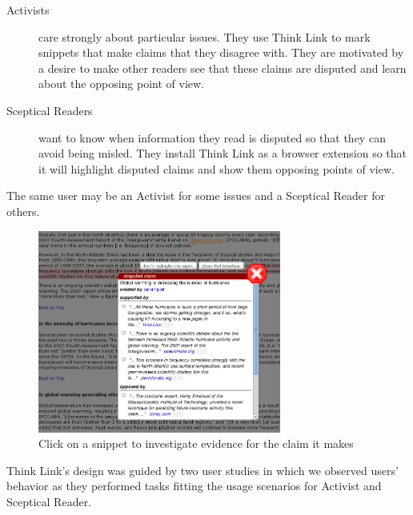 \documentclass{chi2009}
\newcommand{\todo}[1]{}
\begin{document}
\begin{description}
\item[Activists] care strongly about particular issues. They use Think Link to mark snippets that make claims that they disagree with. They are motivated by a desire to make other readers see that these claims are disputed and learn about the opposing point of view.

\item[Sceptical Readers] want to know when information they read is disputed so that they can avoid being misled. They install Think Link as a browser extension so that it will highlight disputed claims and show them opposing points of view.
\end{description}

The same user may be an Activist for some issues and a Sceptical Reader for others.

\begin{figure}[tb]
	\begin{center}
	\includegraphics[width=8cm]{../screenshots/v2_popup_dim.png}
	\caption{Click on a snippet to investigate evidence for the claim it makes}
	\label{claimview}
	\end{center}
\end{figure}

\todo{Claim panel should have 'more' buttons}

Think Link's design was guided by two user studies in which we observed users' behavior as they performed tasks fitting the usage scenarios for Activist and Sceptical Reader.

\todo{Talk about automatically including all arguments from Snopes}
\todo{I think we need to do some kind of evaluation of the new interface, even if it is just showing it to some people, or having people in the lab try it.}
\todo{Need figures saying how efficient it is for an activist user to mark up a topic}
\end{document}
